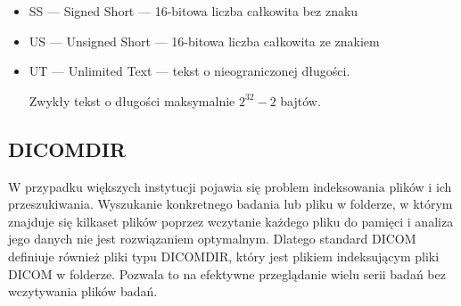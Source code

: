 \begin{itemize}
    \item SS --- Signed Short --- 16-bitowa liczba całkowita bez znaku

    \item US --- Unsigned Short --- 16-bitowa liczba całkowita ze znakiem

    \item UT --- Unlimited Text --- tekst o nieograniczonej długości.

          Zwykły tekst o długości maksymalnie $2^{32}-2$ bajtów.
\end{itemize}

\subsection{DICOMDIR}

W przypadku większych instytucji pojawia się problem indeksowania plików i ich przeszukiwania.
Wyszukanie konkretnego badania lub pliku w folderze, w którym znajduje się kilkaset plików poprzez wczytanie każdego pliku do pamięci i analiza jego danych nie jest rozwiązaniem optymalnym.
Dlatego standard DICOM definiuje również pliki typu DICOMDIR, który jest plikiem indeksującym pliki DICOM w folderze.
Pozwala to na efektywne przeglądanie wielu serii badań bez wczytywania plików badań.
